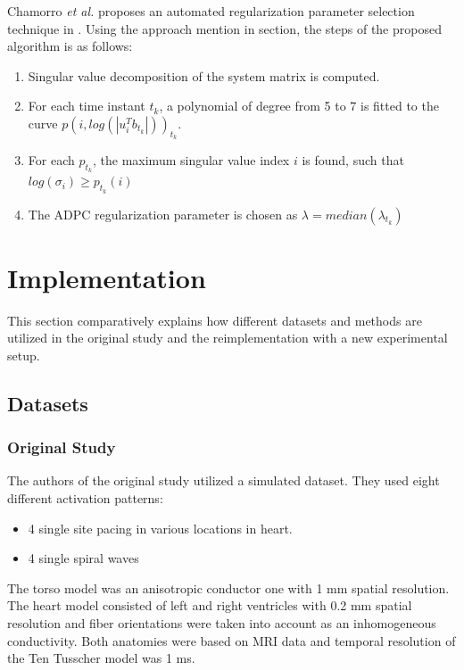 \documentclass[draftcls, onecolumn, journal]{IEEEtran}
\begin{document}
Chamorro \textit{et al.} proposes an automated regularization parameter selection technique in \cite*{chamorro2017improving}. Using the approach mention in  section, the steps of the proposed algorithm is as follows: 

\begin{enumerate}
    \item Singular value decomposition of the system matrix is computed.
    \item For each time instant $t_k$, a polynomial of degree from 5 to 7 is fitted to the curve $p(i,log(|u_i^Tb_{t_k}|))_{t_k}$.
    \item For each $p_{t_k}$, the maximum singular value index $i$ is found, such that $log(\sigma_i) \geq p_{t_k}(i)$
    \item The ADPC regularization parameter is chosen as $\lambda = median({\lambda_{t_k}})$
\end{enumerate}


\section{Implementation}\label{sec:implementation}

This section comparatively explains how different datasets and methods are utilized in the original study and the reimplementation with a new experimental setup. 

\subsection{Datasets}

\subsubsection{Original Study}

The authors of the original study utilized a simulated dataset. They used eight different activation patterns:
\begin{itemize}
    \item 4 single site pacing in various locations in heart.
    \item 4 single spiral waves
\end{itemize}
The torso model was an anisotropic conductor one with 1 mm spatial resolution. The heart model consisted of left and right ventricles with 0.2 mm spatial resolution and fiber orientations were taken into account as an inhomogeneous conductivity. Both anatomies were based on MRI data and temporal resolution of the Ten Tusscher \cite*{ten2004model} model was 1 ms.
\end{document}
